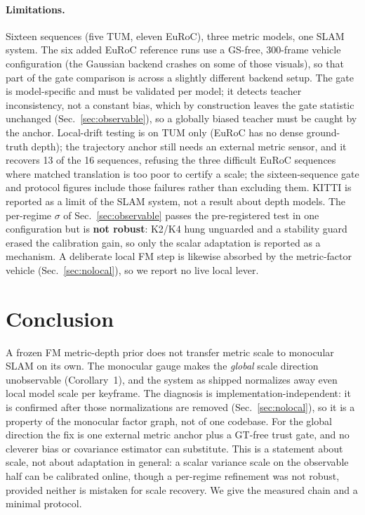 \paragraph{Limitations.} Sixteen sequences (five TUM, eleven EuRoC), three metric
models, one SLAM system. The six added EuRoC reference runs use a GS-free,
300-frame vehicle configuration (the Gaussian backend crashes on some of those
visuals), so that part of the gate comparison is across a slightly different
backend setup. The gate is model-specific and must be validated per model; it
detects teacher inconsistency, not a constant bias, which by construction leaves
the gate statistic unchanged (Sec.~\ref{sec:observable}), so a globally biased teacher must be
caught by the anchor. Local-drift testing is on TUM only (EuRoC has no dense
ground-truth depth); the trajectory anchor still needs an external metric sensor,
and it recovers 13 of the 16 sequences, refusing the three difficult EuRoC
sequences where matched translation is too poor to certify a scale; the
sixteen-sequence gate and protocol figures include those failures rather than
excluding them. KITTI is reported as a limit of the SLAM system, not a result
about depth models.
The per-regime $\sigma$ of Sec.~\ref{sec:observable} passes the pre-registered test in one
configuration but is \textbf{not robust}: K2/K4 hung unguarded and a stability
guard erased the calibration gain, so only the scalar adaptation is reported as a
mechanism. A deliberate local FM step is likewise absorbed by the metric-factor
vehicle (Sec.~\ref{sec:nolocal}), so we report no live local lever.

\section{Conclusion}

A frozen FM metric-depth prior does not transfer metric scale to monocular SLAM
on its own. The monocular gauge makes the \emph{global} scale direction
unobservable (Corollary~1), and the system as shipped normalizes away even local
model scale per keyframe. The diagnosis is implementation-independent: it is
confirmed after those normalizations are removed (Sec.~\ref{sec:nolocal}), so it is a property of
the monocular factor graph, not of one codebase. For the global direction the fix
is one external metric
anchor plus a GT-free trust gate, and no cleverer bias or covariance estimator can
substitute. This is a statement about scale, not about adaptation in general: a
scalar variance scale on the observable half can be calibrated online, though a
per-regime refinement was not robust, provided neither is mistaken for scale
recovery. We give the measured chain and a minimal protocol.

